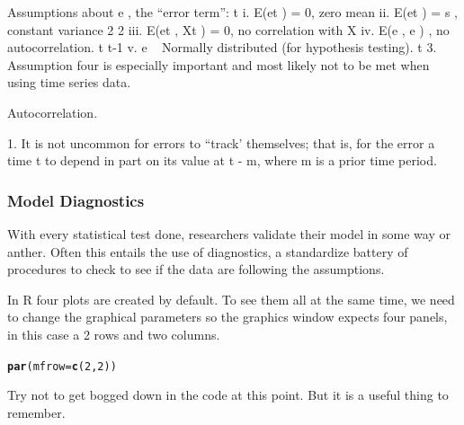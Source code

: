 \documentclass{article}\usepackage[]{graphicx}\usepackage[]{color}
\makeatletter
\newcommand{\hlnum}[1]{\textcolor[rgb]{0.686,0.059,0.569}{#1}}%
\newcommand{\hlstd}[1]{\textcolor[rgb]{0.345,0.345,0.345}{#1}}%
\newcommand{\hlkwc}[1]{\textcolor[rgb]{0.333,0.667,0.333}{#1}}%
\newcommand{\hlkwd}[1]{\textcolor[rgb]{0.737,0.353,0.396}{\textbf{#1}}}%
\newenvironment{kframe}{%
 \def\at@end@of@kframe{}%
 \ifinner\ifhmode%
  \def\at@end@of@kframe{\end{minipage}}%
  \begin{minipage}{\columnwidth}%
 \fi\fi%
 \def\FrameCommand##1{\hskip\@totalleftmargin \hskip-\fboxsep
 \colorbox{shadecolor}{##1}\hskip-\fboxsep
     \hskip-\linewidth \hskip-\@totalleftmargin \hskip\columnwidth}%
 \MakeFramed {\advance\hsize-\width
   \@totalleftmargin\z@ \linewidth\hsize
   \@setminipage}}%
 {\par\unskip\endMakeFramed%
 \at@end@of@kframe}
\newenvironment{knitrout}{}{} %
\makeatother
\begin{document}
Assumptions about e , the “error term”: t
i. E(et
) = 0, zero mean
ii. E(et
) = s , constant variance 2 2
iii. E(et
, Xt
) = 0, no correlation with X 
iv. E(e , e ) , no autocorrelation. t t-1
v. e ~ Normally distributed (for hypothesis testing). t
3. Assumption four is especially important and most likely not to be met when
using time series data.

Autocorrelation.

1. It is not uncommon for errors to “track’ themselves; that is, for the error a time t to depend in part on its value at t - m, where m is a prior time period.

\subsubsection{Model Diagnostics}

With every statistical test done, researchers validate their model in some way or anther. Often this entails the use of diagnostics, a standardize battery of procedures to check to see if the data are following the assumptions. 

In R four plots are created by default.  To see them all at the same time, we need to change the graphical parameters so the graphics window expects four panels, in this case a 2 rows and two columns. 

\begin{knitrout}
\color{fgcolor}\begin{kframe}
\begin{alltt}
\hlkwd{par}\hlstd{(}\hlkwc{mfrow}\hlstd{=}\hlkwd{c}\hlstd{(}\hlnum{2}\hlstd{,}\hlnum{2}\hlstd{))}
\end{alltt}
\end{kframe}
\end{knitrout}

Try not to get bogged down in the code at this point. But it is a useful thing to remember.
\end{document}
